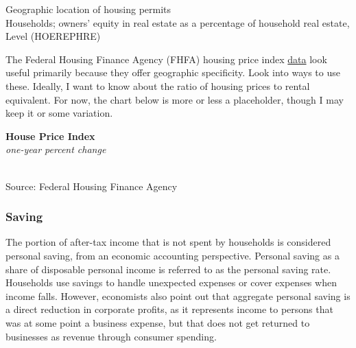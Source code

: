 \documentclass{report}
\makeatletter
\newcommand{\tbllink}[1]{\href{https://raw.githubusercontent.com/bdecon/US-chartbook/master/chartbook/data/#1}{\faTable}}
\newcommand*\short[1]{\expandafter\@gobbletwo\number\numexpr#1\relax}
\newcommand{\dateaxisticks}{
		date coordinates in=x, axis line style={draw=none},
		xmax={2020-02-01},
		max space between ticks=40,	    
		xtick={{1990-01-01}, {1992-01-01}, {1994-01-01}, 
			{1996-01-01}, {1998-01-01}, {2000-01-01}, 
			{2002-01-01}, {2004-01-01}, {2006-01-01},
			{2008-01-01}, {2010-01-01}, {2012-01-01}, {2014-01-01},
		    {2016-01-01}, {2018-01-01}, {2020-01-01}},
		minor xtick={{1989-01-01}, {1991-01-01}, {1993-01-01},
			{1995-01-01}, {1997-01-01}, {1999-01-01}, 
			{2001-01-01}, {2003-01-01}, {2005-01-01}, {2007-01-01},
		    {2009-01-01}, {2011-01-01}, {2013-01-01}, {2015-01-01},
		    {2017-01-01}, {2019-01-01}},
		enlarge y limits={0.06}, enlarge x limits={0.01},
		}
\newcommand{\bbar}[2]{extra #1 ticks = {{#2}}, extra #1 tick labels = ,
		extra #1 tick style = {grid=major, grid style={thick, black!25}},}
\newcommand{\thickline}[4]{\addplot[ultra thick, no markers, color=#1] 
		table [x=#2, y=#3, col sep=comma] {#4};	}
\newcommand{\rbars}{
		\fill[color=black!10] (axis cs:{1990-07-01},\pgfkeysvalueof{/pgfplots/ymin}) rectangle 
			(axis cs:{1991-03-01}, \pgfkeysvalueof{/pgfplots/ymax});
		\fill[color=black!10] (axis cs:{2007-12-01},\pgfkeysvalueof{/pgfplots/ymin}) rectangle 
			(axis cs:{2009-07-01}, \pgfkeysvalueof{/pgfplots/ymax});
		\fill[color=black!10] (axis cs:{2001-03-01},\pgfkeysvalueof{/pgfplots/ymin}) rectangle 
			(axis cs:{2001-11-01}, \pgfkeysvalueof{/pgfplots/ymax});}
\makeatother
\begin{document}
{{{\begin{minipage}{0.76\textwidth}
Geographic location of housing permits \\

Households; owners' equity in real estate as a percentage of household real estate, Level (HOEREPHRE)\\

\vspace{4mm}

\small The Federal Housing Finance Agency (FHFA) housing price index \href{https://www.fhfa.gov/DataTools/Downloads/Pages/House-Price-Index-Datasets.aspx}{data} look useful primarily because they offer geographic specificity. Look into ways to use these. Ideally, I want to know about the ratio of housing prices to rental equivalent. For now, the chart below is more or less a placeholder, though I may keep it or some variation.\\


\vspace{2mm}

\noindent \normalsize \textbf{House Price Index}\\
\footnotesize{\textit{one-year percent change}}\\
\noindent \hspace*{-2mm} \\
\footnotesize{Source: Federal Housing Finance Agency} \hspace{54mm} \tbllink{hpi.csv}\\


\vspace{6mm}

\subsubsection*{\color{black!70} \seriffont Saving}

\small The portion of after-tax income that is not spent by households is considered personal saving, from an economic accounting perspective. Personal saving as a share of disposable personal income is referred to as the personal saving rate. Households use savings to handle unexpected expenses or cover expenses when income falls. However, economists also point out that aggregate personal saving is a direct reduction in corporate profits, as it represents income to persons that was at some point a business expense, but that does not get returned to businesses as revenue through consumer spending. \\


\end{minipage}}}}
\end{document}
